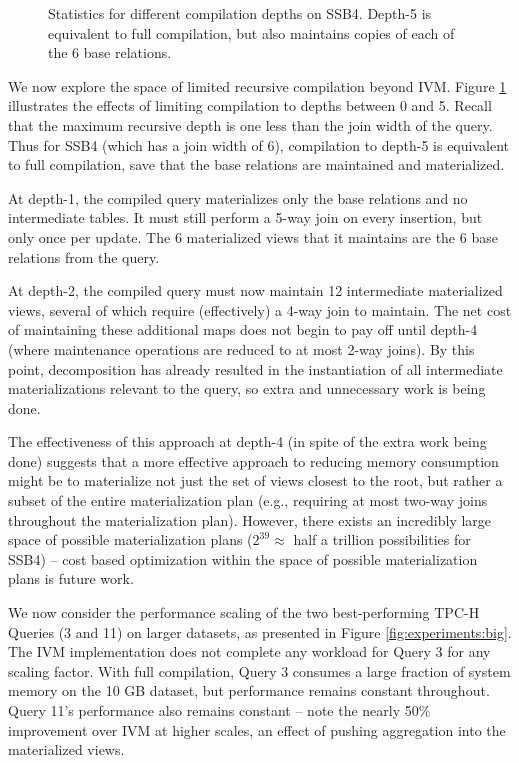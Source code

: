 \begin{figure}
\begin{center}

\caption{Statistics for different compilation depths on SSB4.  Depth-5 is equivalent to full compilation, but also maintains copies of each of the 6 base relations.}
\label{fig:experiments:ssb4depth}
\end{center}
\vspace*{-0.2in}
\end{figure}
We now explore the space of limited recursive compilation beyond IVM.  Figure \ref{fig:experiments:ssb4depth} illustrates the effects of limiting compilation to depths between 0 and 5.  Recall that the maximum recursive depth is one less than the join width of the query.  Thus for SSB4 (which has a join width of 6), compilation to depth-5 is equivalent to full compilation, save that the base relations are maintained and materialized.

At depth-1, the compiled query materializes only the base relations and no intermediate tables.  It must still perform a 5-way join on every insertion, but  only once per update.  The 6 materialized views that it maintains are the 6 base relations from the query.  

At depth-2, the compiled query must now maintain 12 intermediate materialized views, several of which require (effectively) a 4-way join to maintain.  The net cost of maintaining these additional maps does not begin to pay off until depth-4 (where maintenance operations are reduced to at most 2-way joins).  By this point, decomposition has already resulted in the instantiation of all intermediate materializations relevant to the query, so extra and unnecessary work is being done.  

The effectiveness of this approach at depth-4 (in spite of the extra work being done) suggests that a more effective approach to reducing memory consumption might be to materialize not just the set of views closest to the root, but rather a subset of the entire materialization plan (e.g., requiring at most two-way joins throughout the materialization plan).  However, there exists an incredibly large space of possible materialization plans ($2^{39} \approx $ half a trillion possibilities for SSB4) -- cost based optimization within the space of possible materialization plans is future work.

We now consider the performance scaling of the two best-performing TPC-H Queries (3 and 11) on larger datasets, as presented in Figure \ref{fig:experiments:big}.  The IVM implementation does not complete any workload for Query 3 for any scaling factor.  With full compilation, Query 3 consumes a large fraction of system memory on the 10 GB dataset, but performance remains constant throughout.  Query 11's performance also remains constant -- note the nearly 50\% improvement over IVM at higher scales, an effect of pushing aggregation into the materialized views.

